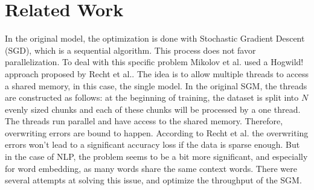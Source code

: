 
\section{Related Work}\label{sec:related_work}
In the original model, the optimization is done with Stochastic Gradient Descent (SGD), which is a sequential algorithm. This process does not favor parallelization. To deal with this specific problem Mikolov et al.\citep{mikolov2} used a Hogwild! approach proposed by Recht et al.\citep{hogwild}. The idea is to allow multiple threads to access a shared memory, in this case, the single model. In the original SGM, the threads are constructed as follows: at the beginning of training, the dataset is split into $N$ evenly sized chunks and each of these chunks will be processed by a one thread. The threads run parallel and have access to the shared memory. Therefore, overwriting errors are bound to happen. According to Recht et al.\citep{hogwild} the overwriting errors won't lead to a significant accuracy loss if the data is sparse enough. But in the case of NLP, the problem seems to be a bit more significant, and especially for word embedding, as many words share the same context words. There were several attempts at solving this issue, and optimize the throughput of the SGM.

